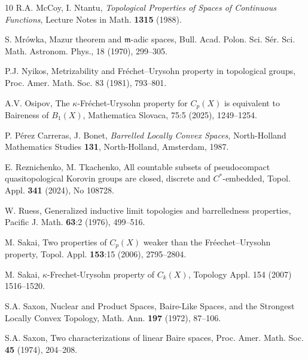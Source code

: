 \documentclass[preprint,11pt]{elsarticle}
\theoremstyle{definition}
\theoremstyle{remark}
\numberwithin{equation}{section}
\numberwithin{theorem}{section}
\begin{document}
\begin{thebibliography}{10}
R.A. McCoy, I. Ntantu, \emph{Topological Properties of Spaces of Continuous Functions}, Lecture Notes in Math.  \textbf{1315} (1988).

S. Mr\'{o}wka, Mazur theorem and $\mathfrak{m}$-adic spaces, Bull. Acad. Polon. Sci. S\'{e}r. Sci.
Math. Astronom. Phys., 18 (1970), 299--305.


P.J. Nyikos, Metrizability and Fr\'{e}chet--Urysohn property in topological groups, Proc. Amer. Math. Soc. 83 (1981), 793–801.



A.V. Osipov, The $\kappa$-Fr\'{e}chet-Urysohn property for $C_p(X)$ is equivalent to Baireness of $B_1(X)$, Mathematica Slovaca, 75:5 (2025), 1249--1254.


P. P\'{e}rez Carreras, J. Bonet, \emph{Barrelled Locally Convex Spaces}, North-Holland Mathematics Studies \textbf{131}, North-Holland, Amsterdam, 1987.


E. Reznichenko, M. Tkachenko, All countable subsets of pseudocompact quasitopological Korovin groups are closed, discrete and $C^\ast$-embedded,  Topol. Appl. \textbf{341} (2024), No 108728.

W. Ruess, Generalized inductive limit topologies and barrelledness properties, Pacific J. Math. \textbf{63}:2 (1976), 499--516.


M. Sakai, Two properties of $C_p(X)$ weaker than the Fr\'{e}echet--Urysohn property, Topol. Appl. \textbf{153}:15 (2006), 2795--2804.

M. Sakai, $\kappa$-Frechet-Urysohn property of $C_k(X)$, Topology Appl. 154 (2007) 1516--1520.

S.A. Saxon, Nuclear and Product Spaces, Baire-Like Spaces, and the Strongest Locally Convex Topology, Math. Ann. \textbf{197} (1972), 87--106.

S.A. Saxon, Two characterizations of linear Baire spaces, Proc. Amer. Math. Soc. \textbf{45} (1974), 204--208.





\end{thebibliography}
\end{document}

